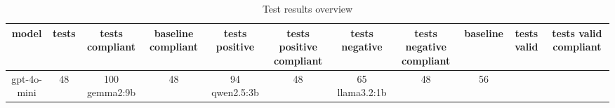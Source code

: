 
  \begin{table}[h!]
  \centering
  \begin{tabular}{|c|c|c|c|c|c|c|c|c|c|c|}
  \hline
  model & tests & tests compliant & baseline compliant & tests positive & tests positive compliant & tests negative & tests negative compliant & baseline & tests valid & tests valid compliant \\
  \hline
  gpt-4o-mini & 48 & 100%
\hline
gemma2:9b & 48 & 94%
\hline
qwen2.5:3b & 48 & 65%
\hline
llama3.2:1b & 48 & 56%
  \end{tabular}
  \caption{Test results overview}
  
  \end{table}
  